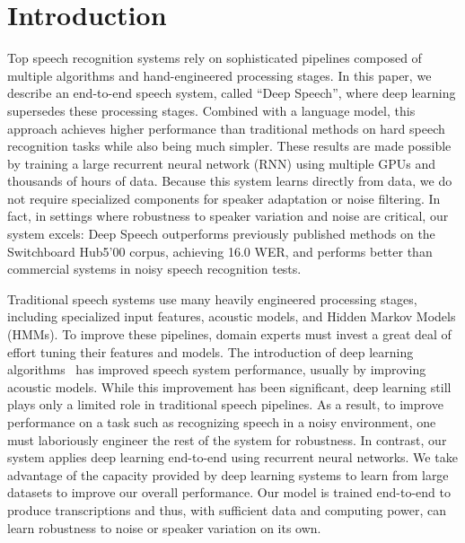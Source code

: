\section{Introduction}
\label{sec:deepspeech:introduction}

Top speech recognition systems rely on sophisticated pipelines composed of
multiple algorithms and hand-engineered processing stages. In this paper, we
describe an end-to-end speech system, called ``Deep Speech'', where deep
learning supersedes these processing stages. Combined with a language model,
this approach achieves higher performance than traditional methods on hard
speech recognition tasks while also being much simpler. These results are made
possible by training a large recurrent neural network (RNN) using multiple GPUs
and thousands of hours of data. Because this system learns directly from data,
we do not require specialized components for speaker adaptation or noise
filtering. In fact, in settings where robustness to speaker variation and noise
are critical, our system excels: Deep Speech outperforms previously published
methods on the Switchboard Hub5'00 corpus, achieving 16.0 WER, and performs
better than commercial systems in noisy speech recognition tests.

Traditional speech systems use many heavily engineered processing stages,
including specialized input features, acoustic models, and Hidden Markov Models
(HMMs). To improve these pipelines, domain experts must invest a great deal of
effort tuning their features and models. The introduction of deep learning
algorithms~\cite{lee2009, mohamed2011, hinton2012, dahl2011a} has improved
speech system performance, usually by improving acoustic models.  While this
improvement has been significant, deep learning still plays only a limited role
in traditional speech pipelines. As a result, to improve performance on a task
such as recognizing speech in a noisy environment, one must laboriously
engineer the rest of the system for robustness. In contrast, our system applies
deep learning end-to-end using recurrent neural networks.  We take advantage of
the capacity provided by deep learning systems to learn from large datasets to
improve our overall performance. Our model is trained end-to-end to produce
transcriptions and thus, with sufficient data and computing power, can learn
robustness to noise or speaker variation on its own.

